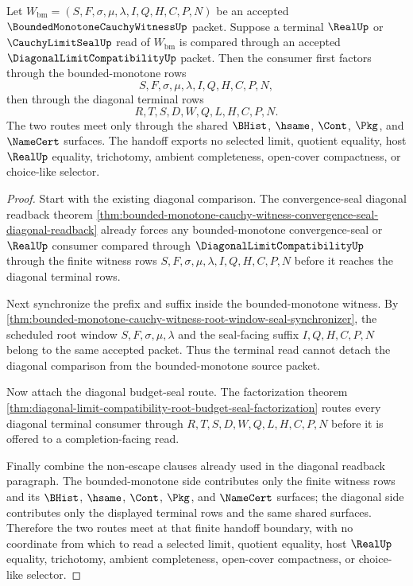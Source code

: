 \begin{theorem}
\label{thm:diagonal-limit-compatibility-bounded-monotone-window-seal-handoff}
Let $W_{\mathrm{bm}}=(S,F,\sigma,\mu,\lambda,I,Q,H,C,P,N)$ be an accepted $\BoundedMonotoneCauchyWitnessUp$ packet. Suppose a terminal $\RealUp$ or $\CauchyLimitSealUp$ read of $W_{\mathrm{bm}}$ is compared through an accepted $\DiagonalLimitCompatibilityUp$ packet. Then the consumer first factors through the bounded-monotone rows
$$
S,F,\sigma,\mu,\lambda,I,Q,H,C,P,N,
$$
then through the diagonal terminal rows
$$
R,T,S,D,W,Q,L,H,C,P,N.
$$
The two routes meet only through the shared $\BHist$, $\hsame$, $\Cont$, $\Pkg$, and $\NameCert$ surfaces. The handoff exports no selected limit, quotient equality, host $\RealUp$ equality, trichotomy, ambient completeness, open-cover compactness, or choice-like selector.
\end{theorem}
\begin{proof}
Start with the existing diagonal comparison. The convergence-seal diagonal readback theorem \autoref{thm:bounded-monotone-cauchy-witness-convergence-seal-diagonal-readback} already forces any bounded-monotone convergence-seal or $\RealUp$ consumer compared through $\DiagonalLimitCompatibilityUp$ through the finite witness rows $S,F,\sigma,\mu,\lambda,I,Q,H,C,P,N$ before it reaches the diagonal terminal rows.

Next synchronize the prefix and suffix inside the bounded-monotone witness. By \autoref{thm:bounded-monotone-cauchy-witness-root-window-seal-synchronizer}, the scheduled root window $S,F,\sigma,\mu,\lambda$ and the seal-facing suffix $I,Q,H,C,P,N$ belong to the same accepted packet. Thus the terminal read cannot detach the diagonal comparison from the bounded-monotone source packet.

Now attach the diagonal budget-seal route. The factorization theorem \autoref{thm:diagonal-limit-compatibility-root-budget-seal-factorization} routes every diagonal terminal consumer through $R,T,S,D,W,Q,L,H,C,P,N$ before it is offered to a completion-facing read.

Finally combine the non-escape clauses already used in the diagonal readback paragraph. The bounded-monotone side contributes only the finite witness rows and its $\BHist$, $\hsame$, $\Cont$, $\Pkg$, and $\NameCert$ surfaces; the diagonal side contributes only the displayed terminal rows and the same shared surfaces. Therefore the two routes meet at that finite handoff boundary, with no coordinate from which to read a selected limit, quotient equality, host $\RealUp$ equality, trichotomy, ambient completeness, open-cover compactness, or choice-like selector.
\end{proof}

